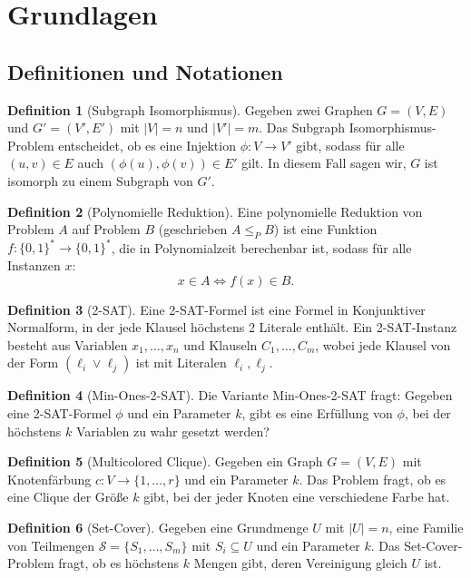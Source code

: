 ﻿\documentclass[a4paper,12pt]{article}
\theoremstyle{definition}
\newtheorem{definition}{Definition}[section]
\begin{document}
\section{Grundlagen}

\subsection{Definitionen und Notationen}

\begin{definition}[Subgraph Isomorphismus]
	Gegeben zwei Graphen $G = (V, E)$ und $G' = (V', E')$ mit $|V| = n$ und $|V'| = m$. Das Subgraph Isomorphismus-Problem entscheidet, ob es eine Injektion $\phi: V \to V'$ gibt, sodass für alle $(u,v) \in E$ auch $(\phi(u), \phi(v)) \in E'$ gilt. In diesem Fall sagen wir, $G$ ist isomorph zu einem Subgraph von $G'$.
\end{definition}

\begin{definition}[Polynomielle Reduktion]
	Eine polynomielle Reduktion von Problem $A$ auf Problem $B$ (geschrieben $A \leq_P B$) ist eine Funktion $f: \{0,1\}^* \to \{0,1\}^*$, die in Polynomialzeit berechenbar ist, sodass für alle Instanzen $x$:
	\[
	x \in A \iff f(x) \in B.
	\]
\end{definition}

\begin{definition}[2-SAT]
	Eine 2-SAT-Formel ist eine Formel in Konjunktiver Normalform, in der jede Klausel höchstens 2 Literale enthält. Ein 2-SAT-Instanz besteht aus Variablen $x_1, \ldots, x_n$ und Klauseln $C_1, \ldots, C_m$, wobei jede Klausel von der Form $(\ell_i \lor \ell_j)$ ist mit Literalen $\ell_i, \ell_j$.
\end{definition}

\begin{definition}[Min-Ones-2-SAT]
	Die Variante Min-Ones-2-SAT fragt: Gegeben eine 2-SAT-Formel $\phi$ und ein Parameter $k$, gibt es eine Erfüllung von $\phi$, bei der höchstens $k$ Variablen zu wahr gesetzt werden?
\end{definition}

\begin{definition}[Multicolored Clique]
	Gegeben ein Graph $G = (V, E)$ mit Knotenfärbung $c: V \to \{1, \ldots, r\}$ und ein Parameter $k$. Das Problem fragt, ob es eine Clique der Größe $k$ gibt, bei der jeder Knoten eine verschiedene Farbe hat.
\end{definition}

\begin{definition}[Set-Cover]
	Gegeben eine Grundmenge $U$ mit $|U| = n$, eine Familie von Teilmengen $\mathcal{S} = \{S_1, \ldots, S_m\}$ mit $S_i \subseteq U$ und ein Parameter $k$. Das Set-Cover-Problem fragt, ob es höchstens $k$ Mengen gibt, deren Vereinigung gleich $U$ ist.
\end{definition}
\end{document}
